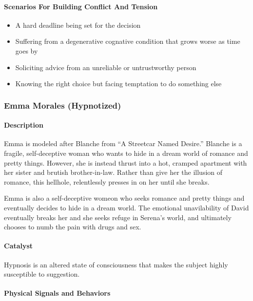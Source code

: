 \paragraph{Scenarios For Building Conflict And Tension}

\begin{itemize}
    \item A hard deadline being set for the decision
    \item Suffering from a degenerative cognative condition that grows worse as time goes by
    \item Soliciting advice from an unreliable or untrustworthy person
    \item Knowing the right choice but facing temptation to do something else
\end{itemize}

\subsubsection{Emma Morales (Hypnotized)}

\paragraph{Description} Emma is modeled after Blanche from ``A Streetcar Named Desire.''
Blanche is a fragile, self-deceptive woman who wants to hide in a dream world of 
romance and pretty things. However, she is instead thrust into a hot, cramped apartment
with her sister and brutish brother-in-law. Rather than give her the illusion of romance,
this hellhole, relentlessly presses in on her until she breaks.

Emma is also a self-deceptive womeon who seeks romance and pretty things and eventually
decides to hide in a dream world. The emotional unavilability of David eventually breaks
her and she seeks refuge in Serena's world, and ultimately chooses to numb the pain with
drugs and sex.

\paragraph{Catalyst} Hypnosis is an altered state of consciousness that makes the subject
highly susceptible to suggestion.

\paragraph{Physical Signals and Behaviors}

